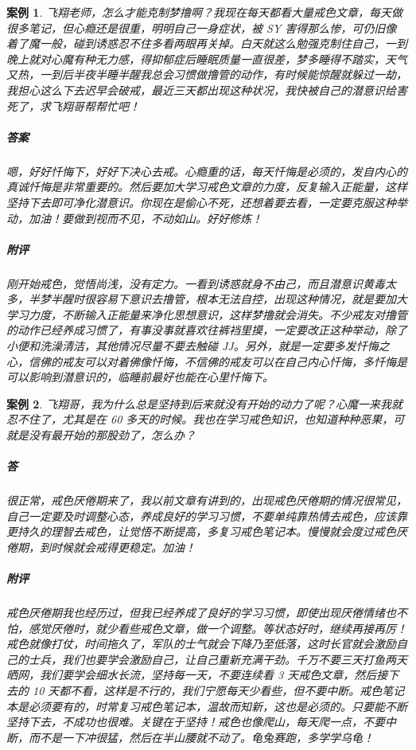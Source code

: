 \documentclass[fontset=founder]{ctexart}
\newtheorem{case}{案例}
\begin{document}
\begin{case}
    飞翔老师，怎么才能克制梦撸啊？我现在每天都看大量戒色文章，每天做很多笔记，但心瘾还是很重，明明自己一身症状，被 SY 害得那么惨，可仍旧像着了魔一般，碰到诱惑忍不住多看两眼再关掉。白天就这么勉强克制住自己，一到晚上就对心魔有种无力感，得抑郁症后睡眠质量一直很差，梦多睡得不踏实，天气又热，一到后半夜半睡半醒我总会习惯做撸管的动作，有时候能惊醒就躲过一劫，我担心这么下去迟早会破戒，最近三天都出现这种状况，我快被自己的潜意识给害死了，求飞翔哥帮帮忙吧！
    \subparagraph{答案} 嗯，好好忏悔下，好好下决心去戒。心瘾重的话，每天忏悔是必须的，发自内心的真诚忏悔是非常重要的。然后要加大学习戒色文章的力度，反复输入正能量，这样坚持下去即可净化潜意识。你现在是偷心不死，还想着要去看，一定要克服这种举动，加油！要做到视而不见，不动如山。好好修炼！
    \subparagraph{附评} 刚开始戒色，觉悟尚浅，没有定力。一看到诱惑就身不由己，而且潜意识黄毒太多，半梦半醒时很容易下意识去撸管，根本无法自控，出现这种情况，就是要加大学习力度，不断输入正能量来净化思想意识，这样梦撸就会消失。不少戒友对撸管的动作已经养成习惯了，有事没事就喜欢往裤裆里摸，一定要改正这种举动，除了小便和洗澡清洁，其他情况尽量不要去触碰 JJ。另外，就是一定要多发忏悔之心，信佛的戒友可以对着佛像忏悔，不信佛的戒友可以在自己内心忏悔，多忏悔是可以影响到潜意识的，临睡前最好也能在心里忏悔下。
\end{case}

\begin{case}
    飞翔哥，我为什么总是坚持到后来就没有开始的动力了呢？心魔一来我就忍不住了，尤其是在 60 多天的时候。我也在学习戒色知识，也知道种种恶果，可就是没有最开始的那股劲了，怎么办？
    \subparagraph{答} 很正常，戒色厌倦期来了，我以前文章有讲到的，出现戒色厌倦期的情况很常见，自己一定要及时调整心态，养成良好的学习习惯，不要单纯靠热情去戒色，应该靠更持久的理智去戒色，让觉悟不断提高，多复习戒色笔记本。慢慢就会度过戒色厌倦期，到时候就会戒得更稳定。加油！
    \subparagraph{附评} 戒色厌倦期我也经历过，但我已经养成了良好的学习习惯，即使出现厌倦情绪也不怕，感觉厌倦时，就少看些戒色文章，做一个调整。等状态好时，继续再接再厉！戒色就像打仗，时间拖久了，军队的士气就会下降乃至低落，这时长官就会激励自己的士兵，我们也要学会激励自己，让自己重新充满干劲。千万不要三天打鱼两天晒网，我们要学会细水长流，坚持每一天，不要连续看 3 天戒色文章，然后接下去的 10 天都不看，这样是不行的，我们宁愿每天少看些，但不要中断。戒色笔记本是必须要有的，时常复习戒色笔记本，温故而知新，这也是必须的。只要能不断坚持下去，不成功也很难。关键在于坚持！戒色也像爬山，每天爬一点，不要中断，而不是一下冲很猛，然后在半山腰就不动了。龟兔赛跑，多学学乌龟！
\end{case}
\end{document}
